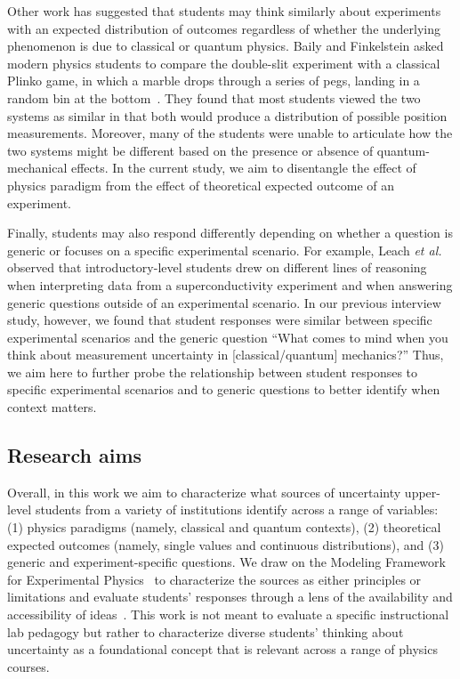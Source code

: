 \documentclass[english,aps,prstper,reprint,showpacs,longbibliography,superscriptaddress,nofootinbib]{revtex4-2}
\begin{document}
Other work has suggested that students may think similarly about experiments with an expected distribution of outcomes regardless of whether the underlying phenomenon is due to classical or quantum physics. Baily and Finkelstein asked modern physics students to compare the double-slit experiment with a classical Plinko game, in which a marble drops through a series of pegs, landing in a random bin at the bottom~\cite{Baily2009a}. They found that most students viewed the two systems as similar in that both would produce a distribution of possible position measurements. Moreover, many of the students were unable to articulate how the two systems might be different based on the presence or absence of quantum-mechanical effects. In the current study, we aim to disentangle the effect of physics paradigm from the effect of theoretical expected outcome of an experiment.

Finally, students may also respond differently depending on whether a question is generic or focuses on a specific experimental scenario. For example, Leach \textit{et al.}~\cite{Leach2000} observed that introductory-level students drew on different lines of reasoning when interpreting data from a superconductivity experiment and when answering generic questions outside of an experimental scenario. In our previous interview study, however, we found that student responses were similar between specific experimental scenarios and the generic question ``What comes to mind when you think about measurement uncertainty in [classical/quantum] mechanics?'' Thus, we aim here to further probe the relationship between student responses to specific experimental scenarios and to generic questions to better identify when context matters.

\subsection{Research aims}

Overall, in this work we aim to characterize what sources of uncertainty upper-level students from a variety of institutions identify across a range of variables: (1) physics paradigms (namely, classical and quantum contexts), (2) theoretical expected outcomes (namely, single values and continuous distributions), and (3) generic and experiment-specific questions. We draw on the Modeling Framework for Experimental Physics~\cite{DounasFrazer2018,Zwickl2015} to characterize the sources as either principles or limitations and evaluate students' responses through a lens of the availability and accessibility of ideas~\cite{Heckler2018}. This work is not meant to evaluate a specific instructional lab pedagogy but rather to characterize diverse students' thinking about uncertainty as a foundational concept that is relevant across a range of physics courses.
\end{document}
